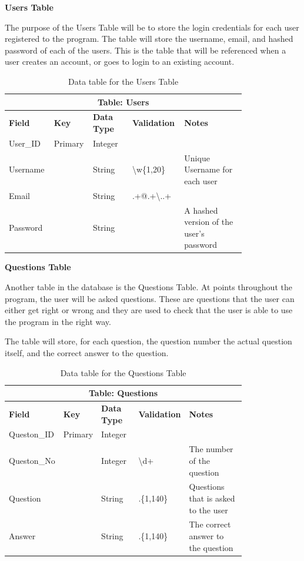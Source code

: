 \documentclass[12pt]{article}
\begin{document}
\clearpage
\textbf{Users Table}

The purpose of the Users Table will be to store the login credentials for each user registered to the program. The table will store the username, email, and hashed password of each of the users. This is the table that will be referenced when a user creates an account, or goes to login to an existing account.

\begin{table}[ht]
    \centering
    \begin{tabular}{ | p{0.15\linewidth} | p{0.1\linewidth} | p{0.16\linewidth} | p{0.14\linewidth} | p{0.25\linewidth} | }
    \hline
    \multicolumn{5}{|c|}{\textbf{Table: Users}}\\
    \hline
    \hline
    \textbf{Field} & \textbf{Key} & \textbf{Data Type} & \textbf{Validation} & \textbf{Notes} \\
    \hline
    User\_ID & Primary & Integer & & \\
    \hline
    Username & & String & \textbackslash w\{1,20\} & Unique Username for each user\\
    \hline
    Email & & String & .+@.+\textbackslash ..+ & \\
    \hline
    Password & & String & & A hashed version of the user's password\\
    \hline
    \end{tabular}
    \caption{Data table for the Users Table}
\end{table}

\textbf{Questions Table}

Another table in the database is the Questions Table. At points throughout the program, the user will be asked questions. These are questions that the user can either get right or wrong and they are used to check that the user is able to use the program in the right way.

The table will store, for each question, the question number the actual question itself, and the correct answer to the question.

\begin{table}[ht]
    \centering
    \begin{tabular}{ | p{0.15\linewidth} | p{0.1\linewidth} | p{0.16\linewidth} | p{0.14\linewidth} | p{0.25\linewidth} | }
    \hline
    \multicolumn{5}{|c|}{\textbf{Table: Questions}}\\
    \hline
    \hline
    \textbf{Field} & \textbf{Key} & \textbf{Data Type} & \textbf{Validation} & \textbf{Notes} \\
    \hline
    Queston\_ID & Primary & Integer & & \\
    \hline
    Queston\_No & & Integer & \textbackslash d+ & The number of the question\\
    \hline
    Question & & String & .\{1,140\} & Questions that is asked to the user\\
    \hline
    Answer & & String & .\{1,140\} & The correct answer to the question\\
    \hline
    \end{tabular}
    \caption{Data table for the Questions Table}
\end{table}
\end{document}
